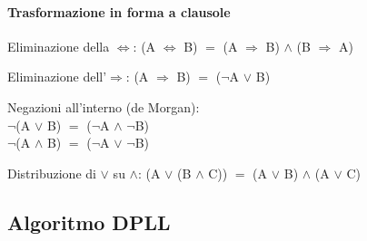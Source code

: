 \documentclass[10pt]{book}
\begin{document}
\paragraph{Trasformazione in forma a clausole}
\begin{list}{-}{I passi sono:}
	\item Eliminazione della $\Leftrightarrow$: (A $\Leftrightarrow$ B) $=$ (A $\Rightarrow$ B) $\wedge$ (B $\Rightarrow$ A)
	\item Eliminazione dell'$\Rightarrow$: (A $\Rightarrow$ B) $=$ ($\neg$A $\vee$ B)
	\item Negazioni all'interno (de Morgan):\\
	$\neg$(A $\vee$ B) $=$ ($\neg$A $\wedge$ $\neg$B)\\
	$\neg$(A $\wedge$ B) $=$ ($\neg$A $\vee$ $\neg$B)
	\item Distribuzione di $\vee$ su $\wedge$: (A $\vee$ (B $\wedge$ C)) $=$ (A $\vee$ B) $\wedge$ (A $\vee$ C)
\end{list}
\subsection{Algoritmo DPLL}
\end{document}
